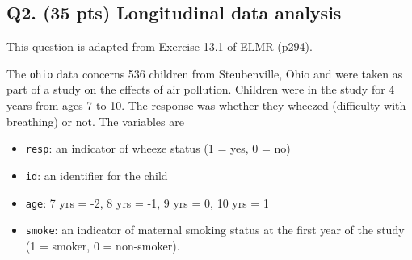 \documentclass[
]{article}
\begin{document}
\hypertarget{q2.-35-pts-longitudinal-data-analysis}{%
\subsection{Q2. (35 pts) Longitudinal data
analysis}\label{q2.-35-pts-longitudinal-data-analysis}}

This question is adapted from Exercise 13.1 of ELMR (p294).

The \texttt{ohio} data concerns 536 children from Steubenville, Ohio and
were taken as part of a study on the effects of air pollution. Children
were in the study for 4 years from ages 7 to 10. The response was
whether they wheezed (difficulty with breathing) or not. The variables
are

\begin{itemize}
\item
  \texttt{resp}: an indicator of wheeze status (1 = yes, 0 = no)
\item
  \texttt{id}: an identifier for the child
\item
  \texttt{age}: 7 yrs = -2, 8 yrs = -1, 9 yrs = 0, 10 yrs = 1
\item
  \texttt{smoke}: an indicator of maternal smoking status at the first
  year of the study (1 = smoker, 0 = non-smoker).
\end{itemize}
\end{document}
